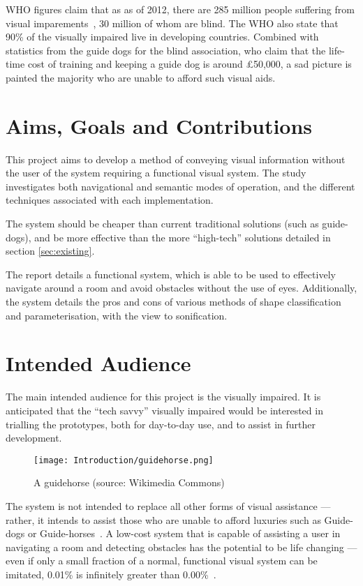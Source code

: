 \label{chap:introduction}
\ac{WHO} figures claim that as as of 2012, there are 285 million people suffering from visual imparements~\cite{whoblindness}, 30 million of whom are blind. The \ac{WHO} also state that 90\% of the visually impaired live in developing countries. Combined with statistics from the guide dogs for the blind association, who claim that the life-time cost of training and keeping a guide dog is around \pounds50,000, a sad picture is painted the majority who are unable to afford such visual aids.

\section{Aims, Goals and Contributions}
This project aims to develop a method of conveying visual information without the user of the system requiring a functional visual system. The study investigates both navigational and semantic modes of operation, and the different techniques associated with each implementation.

The system should be cheaper than current traditional solutions (such as guide-dogs), and be more effective than the more ``high-tech'' solutions detailed in section \ref{sec:existing}.

The report details a functional system, which is able to be used to effectively navigate around a room and avoid obstacles without the use of eyes. Additionally, the system details the pros and cons of various methods of shape classification and parameterisation, with the view to sonification. 

\section{Intended Audience}
The main intended audience for this project is the visually impaired. It is anticipated that the ``tech savvy'' visually impaired would be interested in trialling the prototypes, both for day-to-day use, and to assist in further development.

\begin{figure}[H]
    \centering
    \texttt{[image: Introduction/guidehorse.png]}
    \caption{A guidehorse (source: Wikimedia Commons)}
\end{figure}

The system is not intended to replace all other forms of visual assistance --- rather, it intends to assist those who are unable to afford luxuries such as Guide-dogs or Guide-horses~\cite{guidehorse}. A low-cost system that is capable of assisting a user in navigating a room and detecting obstacles has the potential to be life changing --- even if only a small fraction of a normal, functional visual system can be imitated, 0.01\% is infinitely greater than 0.00\%~\cite{dawkins1996blind}.

